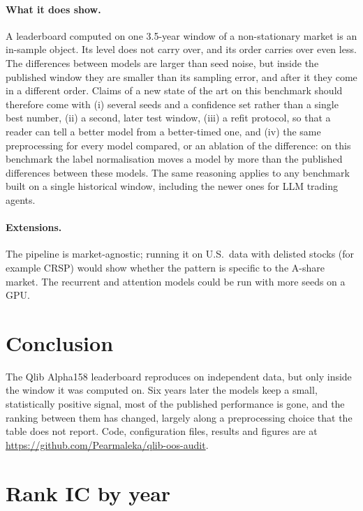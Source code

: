 \documentclass[11pt]{article}
\begin{document}
\paragraph{What it does show.}
A leaderboard computed on one 3.5-year window of a non-stationary market is an in-sample object.
Its level does not carry over, and its order carries over even less.
The differences between models are larger than seed noise, but inside the published window they are smaller than its sampling error, and after it they come in a different order.
Claims of a new state of the art on this benchmark should therefore come with (i) several seeds and a confidence set rather than a single best number, (ii) a second, later test window, (iii) a refit protocol, so that a reader can tell a better model from a better-timed one, and (iv) the same preprocessing for every model compared, or an ablation of the difference: on this benchmark the label normalisation moves a model by more than the published differences between these models.
The same reasoning applies to any benchmark built on a single historical window, including the newer ones for LLM trading agents.

\paragraph{Extensions.}
The pipeline is market-agnostic; running it on U.S.\ data with delisted stocks (for example CRSP) would show whether the pattern is specific to the A-share market.
The recurrent and attention models could be run with more seeds on a GPU.

\section{Conclusion}
The Qlib Alpha158 leaderboard reproduces on independent data, but only inside the window it was computed on.
Six years later the models keep a small, statistically positive signal, most of the published performance is gone, and the ranking between them has changed, largely along a preprocessing choice that the table does not report.
Code, configuration files, results and figures are at \url{https://github.com/Pearmaleka/qlib-oos-audit}.




\appendix
\section{Rank IC by year}

\begin{table}[h]
\centering\small
\caption{Mean daily Rank IC by calendar year, published protocol, seed ensembles. 2017--2019 and the first seven months of 2020 form the published window; 2026 runs to 11 November.}\label{tab:yearly}
\setlength{\tabcolsep}{4pt}

\end{table}
\end{document}
